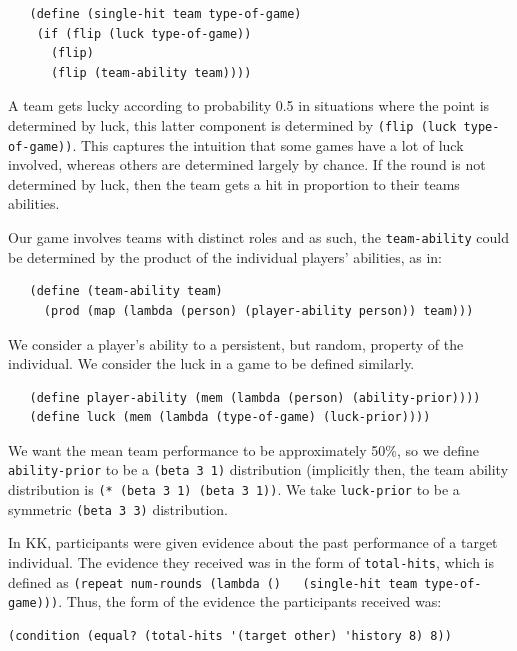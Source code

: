 \documentclass{article}
\begin{document}
\begin{lstlisting}
   (define (single-hit team type-of-game)
    (if (flip (luck type-of-game)) 
      (flip) 
      (flip (team-ability team))))
\end{lstlisting}

A team gets lucky according to probability 0.5 in situations where the point is determined by luck, this latter component is determined by \lstinline{(flip (luck type-of-game))}. This captures the intuition that some games have a lot of luck involved, whereas others are determined largely by chance. If the round is not determined by luck, then the team gets a hit in proportion to their teams abilities. 

Our game involves teams with distinct roles and as such, the \lstinline{team-ability} could be determined by the product of the individual players' abilities, as in:

\begin{lstlisting}
   (define (team-ability team)
     (prod (map (lambda (person) (player-ability person)) team)))
\end{lstlisting}

We consider a player's ability to a persistent, but random, property of the individual. We consider the luck in a game to be defined similarly. 

\begin{lstlisting}
   (define player-ability (mem (lambda (person) (ability-prior))))
   (define luck (mem (lambda (type-of-game) (luck-prior))))
\end{lstlisting}

We want the mean team performance to be approximately 50\%, so we define \lstinline{ability-prior} to be a \lstinline{(beta 3 1)} distribution (implicitly then, the team ability distribution is \lstinline{(* (beta 3 1) (beta 3 1))}. We take \lstinline{luck-prior} to be a symmetric \lstinline{(beta 3 3)} distribution. 

In KK, participants were given evidence about the past performance of a target individual. The evidence they received was in the form of \lstinline{total-hits}, which is defined as \lstinline{(repeat num-rounds (lambda ()   (single-hit team type-of-game)))}. Thus, the form of the evidence the participants received was:

\begin{lstlisting}
(condition (equal? (total-hits '(target other) 'history 8) 8))
\end{lstlisting}
\end{document}
